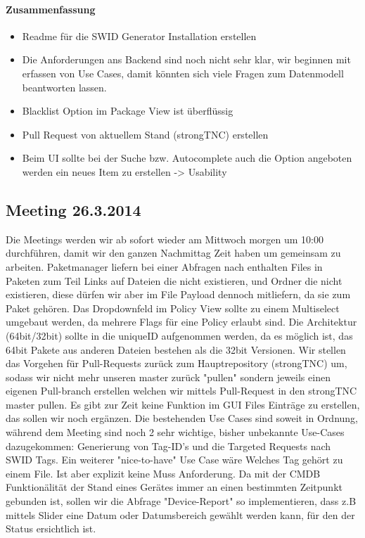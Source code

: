\paragraph{Zusammenfassung}
\begin{itemize}
\item Readme für die SWID Generator Installation erstellen
\item Die Anforderungen ans Backend sind noch nicht sehr klar, wir beginnen mit erfassen von Use Cases, damit könnten sich viele Fragen zum Datenmodell beantworten lassen.
\item Blacklist Option im Package View ist überflüssig
\item Pull Request von aktuellem Stand (strongTNC) erstellen
\item Beim UI sollte bei der Suche bzw. Autocomplete auch die Option angeboten werden ein neues Item zu erstellen -> Usability
\end{itemize}

\subsection{Meeting 26.3.2014}
Die Meetings werden wir ab sofort wieder am Mittwoch morgen um 10:00 durchführen, damit wir den ganzen Nachmittag Zeit haben um gemeinsam zu arbeiten. Paketmanager liefern bei einer Abfragen nach enthalten Files in Paketen zum Teil Links auf Dateien die nicht existieren, und Ordner die nicht existieren, diese dürfen wir aber im File Payload dennoch mitliefern, da sie zum Paket gehören. Das Dropdownfeld im Policy View sollte zu einem Multiselect umgebaut werden, da mehrere Flags für eine Policy erlaubt sind. Die Architektur (64bit/32bit) sollte in die uniqueID aufgenommen werden, da es möglich ist, das 64bit Pakete aus anderen Dateien bestehen als die 32bit Versionen. Wir stellen das Vorgehen für Pull-Requests zurück zum Hauptrepository (strongTNC) um, sodass wir nicht mehr unseren master zurück "pullen" sondern jeweils einen eigenen Pull-branch erstellen welchen wir mittels Pull-Request in den strongTNC master pullen. Es gibt zur Zeit keine Funktion im GUI Files Einträge zu erstellen, das sollen wir noch ergänzen. Die bestehenden Use Cases sind soweit in Ordnung, während dem Meeting sind noch 2 sehr wichtige, bisher unbekannte Use-Cases dazugekommen: Generierung von Tag-ID's und die Targeted Requests nach SWID Tags.
Ein weiterer "nice-to-have" Use Case wäre Welches Tag gehört zu einem File. Ist aber explizit keine Muss Anforderung.
Da mit der CMDB Funktionälität der Stand eines Gerätes immer an einen bestimmten Zeitpunkt gebunden ist, sollen wir die Abfrage "Device-Report" so implementieren, dass z.B mittels Slider eine Datum oder Datumsbereich gewählt werden kann, für den der Status ersichtlich ist.

